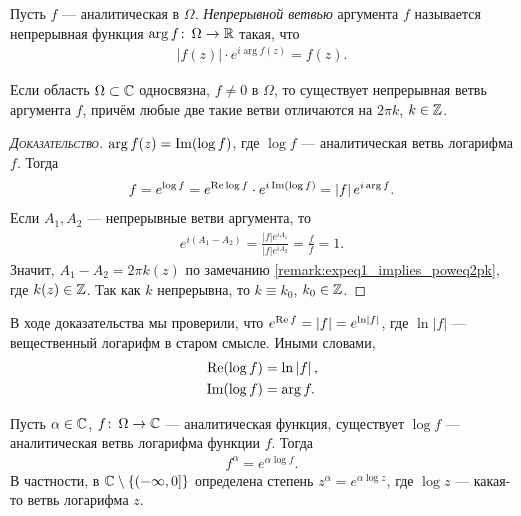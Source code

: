 \documentclass[../complex-analysis.tex]{subfiles}
\begin{document}
\begin{df}
 Пусть $ f $ --- аналитическая в $ \Omega $. \textit{Непрерывной ветвью} аргумента $ f $ называется непрерывная функция $ \arg f \colon\, \Omega \to \mathbb{R} $ такая, что
 \begin{align*}
  \left| f(z) \right| \cdot e^{i \arg f(z)} = f(z).
 \end{align*}
\end{df}
\begin{thm}
 Если область $ \Omega \subset \mathbb{C}  $ односвязна, $ f \neq 0 $ в $ \Omega $, то существует непрерывная ветвь аргумента $ f $, причём любые две такие ветви отличаются на $ 2\pi k $, $ k \in \mathbb{Z} $.
\end{thm}
\begin{proof}[\normalfont\textsc{Доказательство}]
 $ \arg f(z) = \operatorname{Im} (\log f) $, где $ \log f $ --- аналитическая ветвь логарифма $ f $. Тогда
 \begin{align*}
 f = e^{\log f} = e^{\operatorname{Re} \log f} \cdot e^{i \operatorname{Im} (\log f)} = \left| f \right| e^{i \arg f}.
 \end{align*} Если $ A_1, A_2 $ --- непрерывные ветви аргумента, то
 \begin{align*}
  e^{i(A_1 - A_2)} = \frac{\left| f \right|e^{iA_1}}{\left| f \right|e^{iA_2}} = \frac{f}{f} = 1.
\end{align*} Значит, $ A_1 - A_2 = 2\pi k(z) $ по замечанию \eqref{remark:expeq1_implies_poweq2pk}, где $ k(z) \in \mathbb{Z} $. Так как $ k $ непрерывна, то $ k \equiv k_0 $, $ k_0 \in \mathbb{Z} $.
\end{proof}
\begin{remrk}
 В ходе доказательства мы проверили, что $ e^{\operatorname{Re} f} = \left| f \right| = e^{\ln \left| f \right|} $, где $ \ln \left| f \right| $ --- вещественный логарифм в старом смысле. Иными словами,
 \begin{align*}
  \operatorname{Re} (\log f) &= \ln \left| f \right|, \\
  \operatorname{Im} (\log f) &= \arg f.
 \end{align*}
\end{remrk}

\begin{df}
 Пусть $ \alpha \in\mathbb{C} $, $ f \colon\, \Omega \to \mathbb{C}   $ --- аналитическая функция, существует $ \log f $  --- аналитическая ветвь логарифма функции $ f $. Тогда
 \begin{align*}
  f^{\alpha} = e^{\alpha \log f}.
 \end{align*} В частности, в $ \mathbb{C} \setminus \left\{ \left(-\infty, 0\right]   \right\} $  определена степень $ z^{\alpha} = e^{\alpha \log z} $, где $ \log z $ --- какая-то ветвь логарифма $ z $.
\end{df}
\end{document}
